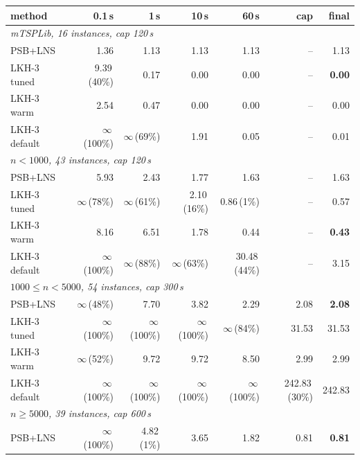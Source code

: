 \begin{tabular}{lrrrrrr}
\toprule
method & 0.1\,s & 1\,s & 10\,s & 60\,s & cap & final \\
\midrule
\multicolumn{7}{l}{\emph{mTSPLib, 16 instances, cap 120\,s}} \\
PSB+LNS & 1.36 & 1.13 & 1.13 & 1.13 & -- & 1.13 \\
LKH-3 tuned & 9.39\,{\scriptsize(40\%)} & 0.17 & 0.00 & 0.00 & -- & \textbf{0.00} \\
LKH-3 warm & 2.54 & 0.47 & 0.00 & 0.00 & -- & 0.00 \\
LKH-3 default & \ensuremath{\infty}\,{\scriptsize(100\%)} & \ensuremath{\infty}\,{\scriptsize(69\%)} & 1.91 & 0.05 & -- & 0.01 \\
\midrule
\multicolumn{7}{l}{\emph{$n<1000$, 43 instances, cap 120\,s}} \\
PSB+LNS & 5.93 & 2.43 & 1.77 & 1.63 & -- & 1.63 \\
LKH-3 tuned & \ensuremath{\infty}\,{\scriptsize(78\%)} & \ensuremath{\infty}\,{\scriptsize(61\%)} & 2.10\,{\scriptsize(16\%)} & 0.86\,{\scriptsize(1\%)} & -- & 0.57 \\
LKH-3 warm & 8.16 & 6.51 & 1.78 & 0.44 & -- & \textbf{0.43} \\
LKH-3 default & \ensuremath{\infty}\,{\scriptsize(100\%)} & \ensuremath{\infty}\,{\scriptsize(88\%)} & \ensuremath{\infty}\,{\scriptsize(63\%)} & 30.48\,{\scriptsize(44\%)} & -- & 3.15 \\
\midrule
\multicolumn{7}{l}{\emph{$1000\le n<5000$, 54 instances, cap 300\,s}} \\
PSB+LNS & \ensuremath{\infty}\,{\scriptsize(48\%)} & 7.70 & 3.82 & 2.29 & 2.08 & \textbf{2.08} \\
LKH-3 tuned & \ensuremath{\infty}\,{\scriptsize(100\%)} & \ensuremath{\infty}\,{\scriptsize(100\%)} & \ensuremath{\infty}\,{\scriptsize(100\%)} & \ensuremath{\infty}\,{\scriptsize(84\%)} & 31.53 & 31.53 \\
LKH-3 warm & \ensuremath{\infty}\,{\scriptsize(52\%)} & 9.72 & 9.72 & 8.50 & 2.99 & 2.99 \\
LKH-3 default & \ensuremath{\infty}\,{\scriptsize(100\%)} & \ensuremath{\infty}\,{\scriptsize(100\%)} & \ensuremath{\infty}\,{\scriptsize(100\%)} & \ensuremath{\infty}\,{\scriptsize(100\%)} & 242.83\,{\scriptsize(30\%)} & 242.83 \\
\midrule
\multicolumn{7}{l}{\emph{$n\ge 5000$, 39 instances, cap 600\,s}} \\
PSB+LNS & \ensuremath{\infty}\,{\scriptsize(100\%)} & 4.82\,{\scriptsize(1\%)} & 3.65 & 1.82 & 0.81 & \textbf{0.81} \\

\end{tabular}
